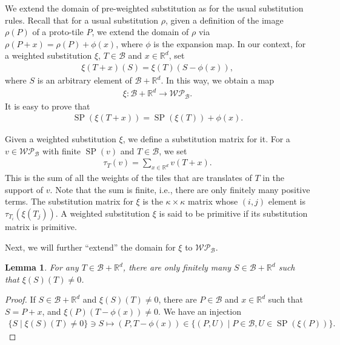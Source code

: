 \documentclass[a4]{amsart}
\DeclareMathOperator{\SP}{SP}
\newcommand{\WP}{\mathcal{W}\mathcal{P}}
\newtheorem{lem}[theorem]{Lemma}
\theoremstyle{definition}
\begin{document}
We extend the domain of pre-weighted substitution as for the usual substitution rules.
Recall that for a usual substitution $\rho$,
given a definition of the image $\rho(P)$ 
of a proto-tile $P$, we extend the domain
of $\rho$ via $\rho(P+x)=\rho(P)+\phi(x)$,
where $\phi$ is the expansion map.
In our context, for a weighted substitution
$\xi$, $T\in\mathcal{B}$ and $x\in\mathbb{R}^d$, set
\begin{align*}
 \xi(T+x)(S)=\xi(T)(S-\phi(x)),
\end{align*}
where $S$ is an arbitrary element of $\mathcal{B}+\mathbb{R}^d$. In this way, we obtain a map
\begin{align*}
\xi\colon\mathcal{B}+\mathbb{R}^d\rightarrow\WP_{\mathcal{B}}.
\end{align*}
 It is easy to prove that
\begin{align*}
 \SP(\xi(T+x))=\SP(\xi(T))+\phi(x).
\end{align*}




Given a weighted substitution $\xi$, we define a substitution matrix for it.
For a $v\in\WP_{\mathcal{B}}$ with finite $\SP(v)$ and $T\in\mathcal{B}$, we set
\begin{align*}
 \tau_T(v)=\sum_{x\in\mathbb{R}^d}v(T+x).
\end{align*}
This is the sum of all the weights of the tiles that are translates of $T$ in the support of $v$.
Note that the sum is finite, i.e., there are only finitely many positive terms. 
The substitution matrix for $\xi$ is the $\kappa\times \kappa$ matrix whose $(i,j)$ element is
$\tau_{T_i}(\xi(T_j))$.
A weighted substitution $\xi$ is said to be primitive if its substitution matrix is
primitive.

Next, we will further ``extend'' the domain for $\xi$ to $\WP_{\mathcal{B}}$.
\begin{lem}\label{lem1_frequency}
 For any $T\in\mathcal{B}+\mathbb{R}^d$, there are only finitely many $S\in\mathcal{B}+\mathbb{R}^d$
such that $\xi(S)(T)\neq 0$.
\end{lem}
\begin{proof}
 If $S\in\mathcal{B}+\mathbb{R}^d$ and $\xi(S)(T)\neq 0$, there are $P\in\mathcal{B}$ and
$x\in\mathbb{R}^d$ such that $S=P+x$, and
$\xi(P)(T-\phi(x))\neq 0$. We have an injection
\begin{align*}
   \{S\mid \xi(S)(T)\neq 0\}\ni S
    \mapsto (P,T-\phi(x))\in\{(P,U)\mid P\in\mathcal{B},U\in\SP(\xi(P))\}.
\end{align*}
\end{proof}
\end{document}
